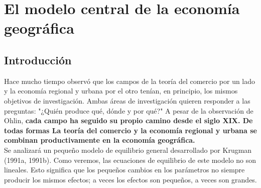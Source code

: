 \chapter{El modelo central de la economía geográfica}

\section{Introducción}
Hace mucho tiempo observó que los campos de la teoría del comercio por un lado y la economía regional y urbana por el otro tenían, en principio, los mismos objetivos de investigación. Ambas áreas de investigación quieren responder a las preguntas: "¿Quién produce qué, dónde y por qué?" A pesar de la observación de Ohlin, \textbf{cada campo ha seguido su propio camino desde el siglo XIX. De todas formas La teoría del comercio y la economía regional y urbana se combinan productivamente en la economía geográfica.}\\
Se analizará un pequeño modelo de equilibrio general desarrollado por Krugman (1991a, 1991b). Como veremos, las ecuaciones de equilibrio de este modelo no son lineales. Esto significa que los pequeños cambios en los parámetros no siempre producir los mismos efectos; a veces los efectos son pequeños, a veces son grandes. 

